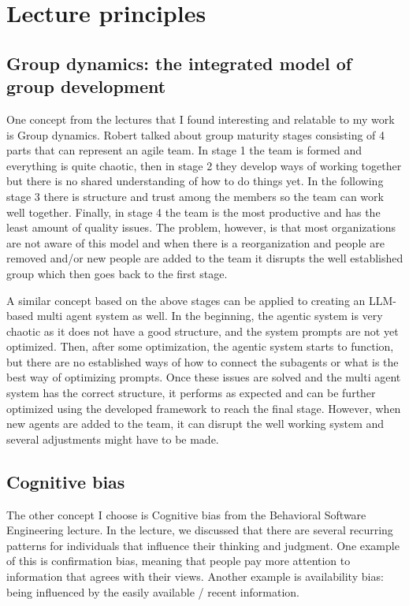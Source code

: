 \documentclass[11pt]{article}
\begin{document}
\section{Lecture principles}

\subsection{Group dynamics: the integrated model of group development}

One concept from the lectures that I found interesting and relatable to my work is Group dynamics. Robert talked about group maturity stages consisting of 4 parts that can represent an agile team. In stage 1 the team is formed and everything is quite chaotic, then in stage 2 they develop ways of working together but there is no shared understanding of how to do things yet. In the following stage 3 there is structure and trust among the members so the team can work well together. Finally, in stage 4 the team is the most productive and has the least amount of quality issues.
The problem, however, is that most organizations are not aware of this model and when there is a reorganization and people are removed and/or new people are added to the team it disrupts the well established group which then goes back to the first stage.

A similar concept based on the above stages can be applied to creating an LLM-based multi agent system as well. In the beginning, the agentic system is very chaotic as it does not have a good structure, and the system prompts are not yet optimized. Then, after some optimization, the agentic system starts to function, but there are no established ways of how to connect the subagents or what is the best way of optimizing prompts. Once these issues are solved and the multi agent system has the correct structure, it performs as expected and can be further optimized using the developed framework to reach the final stage. However, when new agents are added to the team, it can disrupt the well working system and several adjustments might have to be made. 

\subsection{ Cognitive bias}

The other concept I choose is Cognitive bias from the Behavioral Software Engineering lecture. In the lecture, we discussed that there are several recurring patterns for individuals that influence their thinking and judgment. One example of this is confirmation bias, meaning that people pay more attention to information that agrees with their views. Another example is availability bias: being influenced by the easily available / recent information.
\end{document}
